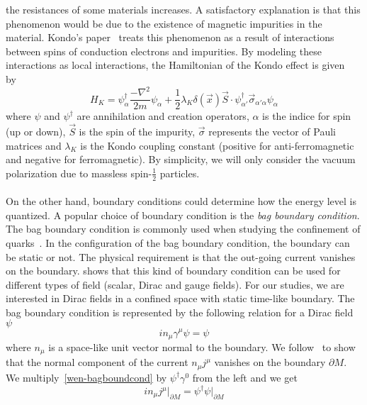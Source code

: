 the resistances of some materials increases. 
A satisfactory explanation is that this phenomenon would be due to the existence of magnetic impurities in the material. 
Kondo's paper~\cite{Kondo1964} treats this phenomenon as a result of interactions between spins of conduction electrons and impurities.
By modeling these interactions as local interactions,
the Hamiltonian of the Kondo effect is given by~\cite{Erdmenger2013}
\begin{equation}\label{vacuum-kondohamiltonian}
H_K = \psi_\alpha^\dagger \frac{-\nabla^2}{2m}\psi_\alpha +
\frac 1 2\lambda_K \delta(\vec{x})\vec{S}\cdot \psi_{\alpha'}^\dagger  \vec{\sigma}_{\alpha' \alpha} \psi_\alpha
\end{equation}
where $\psi$ and $\psi^\dagger$ are annihilation and creation operators, 
$\alpha$ is the indice for spin (up or down), 
$\vec{S}$ is the spin of the impurity,
$\vec{\sigma}$ represents the vector of Pauli matrices and $\lambda_K$ is the Kondo coupling constant (positive for anti-ferromagnetic and negative for ferromagnetic).
By simplicity, we will only consider the vacuum polarization due to massless spin-$\frac 1 2$ particles. \\\\
%
On the other hand, boundary conditions could determine how the energy level is quantized.
A popular choice of boundary condition is the \textit{bag boundary condition}.
The bag boundary condition is commonly used when studying the confinement of quarks~\cite{Hasenfratz1978}.
In the configuration of the bag boundary condition, the boundary can be static or not. 
The physical requirement is that the out-going current vanishes on the boundary.
\cite{Chodos1974} shows that this kind of boundary condition can be used for different types of field (scalar, Dirac and gauge fields). 
For our studies, we are interested in Dirac fields in a confined space with static time-like boundary.
The bag boundary condition is represented by the following relation for a Dirac field $\psi$ 
\begin{equation}\label{wen-bagboundcond}
i n_\mu\gamma^\mu \psi = \psi
\end{equation}
where $n_\mu$ is a space-like unit vector normal to the boundary.
We follow~\cite{Stokes2015} to show that the normal component of the current $n_\mu j^\mu$ vanishes on the boundary $\partial M$.
We multiply~\cref{wen-bagboundcond} by $\psi^\dagger\gamma^0$ from the left and we get
\begin{equation*}
i n_\mu j^\mu \big\vert_{\partial M}= \psi^\dagger\psi \big\vert_{\partial M}
\end{equation*}

